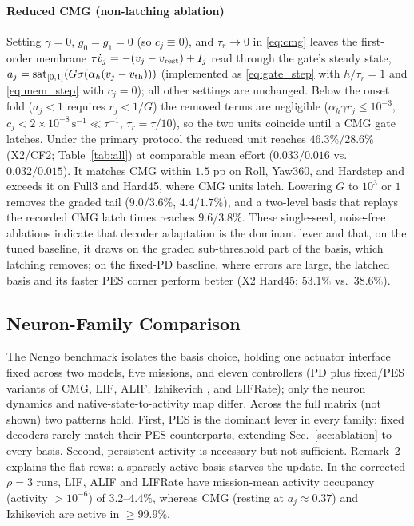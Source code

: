 \documentclass[letterpaper, 10 pt, conference]{ieeeconf}
\newcommand{\sat}{\operatorname{sat}}
\begin{document}
\paragraph{Reduced CMG (non-latching ablation)} Setting $\gamma=0$, $g_0=g_1=0$ (so $c_j\equiv0$), and $\tau_r\to0$ in \eqref{eq:cmg} leaves the first-order membrane $\tau\dot v_j=-(v_j-v_{\rm rest})+I_j$ read through the gate's steady state, $a_j=\sat_{[0,1]}(G\sigma(\alpha_h(v_j-v_{\rm th})))$ (implemented as \eqref{eq:gate_step} with $h/\tau_r=1$ and \eqref{eq:mem_step} with $c_j=0$); all other settings are unchanged. Below the onset fold ($a_j<1$ requires $r_j<1/G$) the removed terms are negligible ($\alpha_h\gamma r_j\le10^{-3}$, $c_j<2\times10^{-8}\,\mathrm{s}^{-1}\ll\tau^{-1}$, $\tau_r=\tau/10$), so the two units coincide until a CMG gate latches. Under the primary protocol the reduced unit reaches $46.3\%/28.6\%$ (X2/CF2; Table~\ref{tab:all}) at comparable mean effort ($0.033/0.016$ vs.\ $0.032/0.015$). It matches CMG within $1.5$ pp on Roll, Yaw360, and Hardstep and exceeds it on Full3 and Hard45, where CMG units latch. Lowering $G$ to $10^3$ or $1$ removes the graded tail ($9.0/3.6\%$, $4.4/1.7\%$), and a two-level basis that replays the recorded CMG latch times reaches $9.6/3.8\%$. These single-seed, noise-free ablations indicate that decoder adaptation is the dominant lever and that, on the tuned baseline, it draws on the graded sub-threshold part of the basis, which latching removes; on the fixed-PD baseline, where errors are large, the latched basis and its faster PES corner perform better (X2 Hard45: $53.1\%$ vs.\ $38.6\%$).

\subsection{Neuron-Family Comparison}
\label{sec:family}

The Nengo benchmark isolates the basis choice, holding one actuator interface fixed across two models, five missions, and eleven controllers (PD plus fixed/PES variants of CMG, LIF, ALIF, Izhikevich \cite{izhikevich2003}, and LIFRate); only the neuron dynamics and native-state-to-activity map differ. Across the full matrix (not shown) two patterns hold. First, PES is the dominant lever in every family: fixed decoders rarely match their PES counterparts, extending Sec.~\ref{sec:ablation} to every basis. Second, persistent activity is necessary but not sufficient. Remark~2 explains the flat rows: a sparsely active basis starves the update. In the corrected $\rho=3$ runs, LIF, ALIF and LIFRate have mission-mean activity occupancy (activity $>10^{-6}$) of $3.2$--$4.4\%$, whereas CMG (resting at $a_j\approx0.37$) and Izhikevich are active in ${\ge}99.9\%$.
\end{document}
